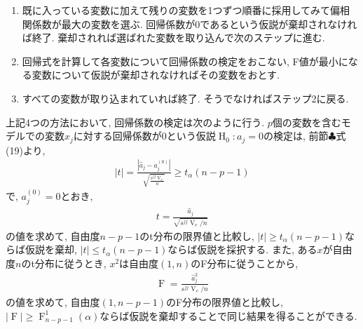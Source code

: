 \begin{description}
\begin{enumerate}
    \item 既に入っている変数に加えて残りの変数を1つずつ順番に採用してみて偏相関係数が最大の変数を選ぶ. 回帰係数が0であるという仮説が棄却されなければ終了. 棄却されれば選ばれた変数を取り込んで次のステップに進む. 
    \item 回帰式を計算して各変数について回帰係数の検定をおこない, F値が最小になる変数について仮説が棄却されなければその変数をおとす.
    \item すべての変数が取り込まれていれば終了. そうでなければステップ2に戻る. 
  \end{enumerate}
\end{description}

上記4つの方法において, 回帰係数の検定は次のように行う. 
$p$個の変数を含むモデルでの変数$x_j$に対する回帰係数が0という仮説$\operatorname{H}_0: a_j=0$の検定は, 前節$\clubsuit$式(19)より, 
\begin{align*}
  |t|= \frac{|\hat{a}_j-a_j^{(0)}|}{\sqrt{\frac{s^{jj}\operatorname{V}_e}{n}}} \geq t_{\alpha}(n-p-1)
\end{align*}
で, $a_j^{(0)}=0$とおき, 
\begin{align}
  t = \frac{\hat{a}_j}{\sqrt{s^{jj}\operatorname{V}_e/n}}
\end{align}
の値を求めて, 自由度$n-p-1$のt分布の限界値と比較し, $|t|\geq t_\alpha(n-p-1)$ならば仮説を棄却, $|t|\leq t_\alpha(n-p-1)$ならば仮説を採択する. また, ある$x$が自由度$n$のt分布に従うとき, $x^2$は自由度$(1, n)$のF分布に従うことから, 
\begin{align}
  \label{eq:f_dist}
  \operatorname{F} = \frac{\hat{a}^2_{j}}{s^{jj}\operatorname{V}_e/n}
\end{align}
の値を求めて, 自由度$(1, n-p-1)$のF分布の限界値と比較し, $|\operatorname{F}|\geq \operatorname{F}_{n-p-1}^1(\alpha)$ならば仮説を棄却することで同じ結果を得ることができる. 

